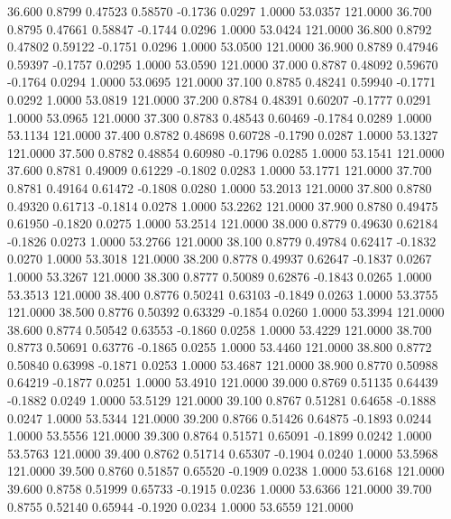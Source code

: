   36.600   0.8799   0.47523   0.58570  -0.1736   0.0297   1.0000  53.0357 121.0000
  36.700   0.8795   0.47661   0.58847  -0.1744   0.0296   1.0000  53.0424 121.0000
  36.800   0.8792   0.47802   0.59122  -0.1751   0.0296   1.0000  53.0500 121.0000
  36.900   0.8789   0.47946   0.59397  -0.1757   0.0295   1.0000  53.0590 121.0000
  37.000   0.8787   0.48092   0.59670  -0.1764   0.0294   1.0000  53.0695 121.0000
  37.100   0.8785   0.48241   0.59940  -0.1771   0.0292   1.0000  53.0819 121.0000
  37.200   0.8784   0.48391   0.60207  -0.1777   0.0291   1.0000  53.0965 121.0000
  37.300   0.8783   0.48543   0.60469  -0.1784   0.0289   1.0000  53.1134 121.0000
  37.400   0.8782   0.48698   0.60728  -0.1790   0.0287   1.0000  53.1327 121.0000
  37.500   0.8782   0.48854   0.60980  -0.1796   0.0285   1.0000  53.1541 121.0000
  37.600   0.8781   0.49009   0.61229  -0.1802   0.0283   1.0000  53.1771 121.0000
  37.700   0.8781   0.49164   0.61472  -0.1808   0.0280   1.0000  53.2013 121.0000
  37.800   0.8780   0.49320   0.61713  -0.1814   0.0278   1.0000  53.2262 121.0000
  37.900   0.8780   0.49475   0.61950  -0.1820   0.0275   1.0000  53.2514 121.0000
  38.000   0.8779   0.49630   0.62184  -0.1826   0.0273   1.0000  53.2766 121.0000
  38.100   0.8779   0.49784   0.62417  -0.1832   0.0270   1.0000  53.3018 121.0000
  38.200   0.8778   0.49937   0.62647  -0.1837   0.0267   1.0000  53.3267 121.0000
  38.300   0.8777   0.50089   0.62876  -0.1843   0.0265   1.0000  53.3513 121.0000
  38.400   0.8776   0.50241   0.63103  -0.1849   0.0263   1.0000  53.3755 121.0000
  38.500   0.8776   0.50392   0.63329  -0.1854   0.0260   1.0000  53.3994 121.0000
  38.600   0.8774   0.50542   0.63553  -0.1860   0.0258   1.0000  53.4229 121.0000
  38.700   0.8773   0.50691   0.63776  -0.1865   0.0255   1.0000  53.4460 121.0000
  38.800   0.8772   0.50840   0.63998  -0.1871   0.0253   1.0000  53.4687 121.0000
  38.900   0.8770   0.50988   0.64219  -0.1877   0.0251   1.0000  53.4910 121.0000
  39.000   0.8769   0.51135   0.64439  -0.1882   0.0249   1.0000  53.5129 121.0000
  39.100   0.8767   0.51281   0.64658  -0.1888   0.0247   1.0000  53.5344 121.0000
  39.200   0.8766   0.51426   0.64875  -0.1893   0.0244   1.0000  53.5556 121.0000
  39.300   0.8764   0.51571   0.65091  -0.1899   0.0242   1.0000  53.5763 121.0000
  39.400   0.8762   0.51714   0.65307  -0.1904   0.0240   1.0000  53.5968 121.0000
  39.500   0.8760   0.51857   0.65520  -0.1909   0.0238   1.0000  53.6168 121.0000
  39.600   0.8758   0.51999   0.65733  -0.1915   0.0236   1.0000  53.6366 121.0000
  39.700   0.8755   0.52140   0.65944  -0.1920   0.0234   1.0000  53.6559 121.0000
